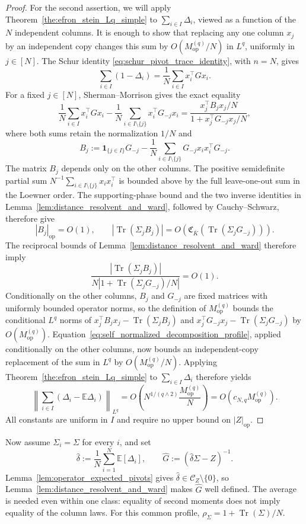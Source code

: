 \documentclass[EJP, preprint, NODS, nobera, nofontexpansion]{ejpecp}
\DeclareMathOperator{\op}{op}
\DeclareMathOperator{\tr}{Tr}
\begin{document}
\begin{proof}
For the second assertion, we will apply
Theorem~\ref{the:efron_stein_Lq_simple} to $\sum_{i\in I}\Delta_i$,
viewed as a function of the $N$ independent columns. It is enough to show
that replacing any one column $x_j$ by an independent copy changes this
sum by $O(M_{\op}^{(q)}/N)$ in $L^q$, uniformly in $j\in[N]$.
The Schur identity \eqref{eq:schur_pivot_trace_identity}, with $n=N$, gives
\[
 \sum_{i\in I}(1-\Delta_i)
 =\frac1N\sum_{i\in I}x_i^\top Gx_i.
\]
For a fixed $j\in[N]$, Sherman--Morrison gives the exact equality
\[
 \frac1N\sum_{i\in I}x_i^\top Gx_i
 -\frac1N\sum_{i\in I\setminus\{j\}}x_i^\top G_{-j}x_i
 =\frac{x_j^\top B_jx_j/N}{1+x_j^\top G_{-j}x_j/N},
\]
where both sums retain the normalization $1/N$ and
\[
 B_j:=\mathbf1_{\{j\in I\}}G_{-j}
 -\frac1N\sum_{i\in I\setminus\{j\}}
   G_{-j}x_ix_i^\top G_{-j}.
\]
The matrix \(B_j\) depends only on the other columns.
The positive semidefinite partial sum
\(N^{-1}\sum_{i\in I\setminus\{j\}}x_ix_i^\top\)
is bounded above by the full leave-one-out sum in the Loewner order.
The supporting-phase bound and the two inverse identities in
Lemma~\ref{lem:distance_resolvent_and_ward}, followed by
Cauchy--Schwarz, therefore give
\[
 |B_j|_{\op}=O(1),\qquad
 |\tr(\Sigma_jB_j)|
 =O\!\left(\mathfrak C_{\bar K}(\tr(\Sigma_jG_{-j}))\right).
\]
The reciprocal bounds of Lemma~\ref{lem:distance_resolvent_and_ward}
therefore imply
\[
 \frac{|\tr(\Sigma_jB_j)|}
 {N|1+\tr(\Sigma_jG_{-j})/N|}=O(1).
\]
Conditionally on the other columns, $B_j$ and $G_{-j}$ are fixed matrices
with uniformly bounded operator norms, so the definition of $M_{\op}^{(q)}$
bounds the conditional $L^q$ norms of
$x_j^\top B_jx_j-\tr(\Sigma_jB_j)$ and
$x_j^\top G_{-j}x_j-\tr(\Sigma_jG_{-j})$ by $O(M_{\op}^{(q)})$.
Equation~\eqref{eq:self_normalized_decomposition_profile}, applied
conditionally on the other columns, now bounds an independent-copy
replacement of the sum in $L^q$ by $O(M_{\op}^{(q)}/N)$.
Applying Theorem~\ref{the:efron_stein_Lq_simple} to
$\sum_{i\in I}\Delta_i$ therefore yields
\[
 \left\|\sum_{i\in I}(\Delta_i-\mathbb E\Delta_i)\right\|_{L^q}
 =O\!\left(N^{1/(q\wedge2)}\frac{M_{\op}^{(q)}}N\right)
 =O\!\left(c_{N,q}M_{\op}^{(q)}\right).
\]
All constants are uniform in $I$ and require no upper bound on
$|Z|_{\op}$.
\end{proof}

Now assume $\Sigma_i=\Sigma$ for every $i$, and set
\[
 \widehat\delta:=\frac1N\sum_{i=1}^N\mathbb E[\Delta_i],
 \qquad \widehat G:=(\widehat\delta\Sigma-Z)^{-1}.
\]
Lemma~\ref{lem:operator_expected_pivots} gives
$\widehat\delta\in\mathcal C_Z\setminus\{0\}$, so
Lemma~\ref{lem:distance_resolvent_and_ward} makes $\widehat G$ well defined.
The average is needed even within one class: equality of second moments
does not imply equality of the column laws.
For this common profile, $\rho_\Sigma=1+\tr(\Sigma)/N$.
\end{document}
